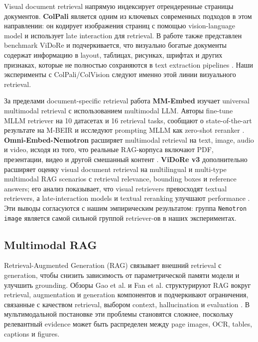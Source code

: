 \documentclass[conference]{IEEEtran}
\begin{document}
Visual document retrieval напрямую индексирует отрендеренные страницы документов. \textbf{ColPali} является одним из ключевых современных подходов в этом направлении: он кодирует изображения страниц с помощью vision-language model и использует late interaction для retrieval. В работе также представлен benchmark ViDoRe и подчеркивается, что визуально богатые документы содержат информацию в layout, таблицах, рисунках, шрифтах и других признаках, которые не полностью сохраняются в text extraction pipelines \cite{colpali2024}. Наши эксперименты с ColPali/ColVision следуют именно этой линии визуального retrieval.

За пределами document-specific retrieval работа \textbf{MM-Embed} изучает universal multimodal retrieval с использованием multimodal LLM. Авторы fine-tune MLLM retriever на 10 датасетах и 16 retrieval tasks, сообщают о state-of-the-art результате на M-BEIR и исследуют prompting MLLM как zero-shot reranker \cite{mmembed2024}. \textbf{Omni-Embed-Nemotron} расширяет multimodal retrieval на text, image, audio и video, исходя из того, что реальные RAG-корпуса включают PDF, презентации, видео и другой смешанный контент \cite{omniembednemotron2025}. \textbf{ViDoRe v3} дополнительно расширяет оценку visual document retrieval на multilingual и multi-type multimodal RAG scenarios с retrieval relevance, bounding boxes и reference answers; его анализ показывает, что visual retrievers превосходят textual retrievers, а late-interaction models и textual reranking улучшают performance \cite{vidorev32026}. Эти выводы согласуются с нашим эмпирическим результатом: группа \texttt{Nemotron image} является самой сильной группой retriever-ов в наших экспериментах.

\subsection{Multimodal RAG}

Retrieval-Augmented Generation (RAG) связывает внешний retrieval с generation, чтобы снизить зависимость от параметрической памяти модели и улучшить grounding. Обзоры Gao et al. и Fan et al. структурируют RAG вокруг retrieval, augmentation и generation компонентов и подчеркивают ограничения, связанные с качеством retrieval, выбором context, hallucination и evaluation \cite{ragsurveygao2023,ragsurveyfan2024}. В мультимодальной постановке эти проблемы становятся сложнее, поскольку релевантный evidence может быть распределен между page images, OCR, tables, captions и figures.
\end{document}
